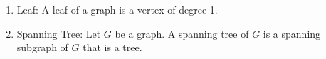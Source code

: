 \documentclass{article}
\begin{document}
\begin{enumerate}
    \item Leaf: A leaf of a graph is a vertex of degree 1.
    
    \item Spanning Tree: Let $G$ be a graph. A spanning tree of $G$ is a spanning subgraph of $G$ that is a tree. 
    
\end{enumerate}
\end{document}
